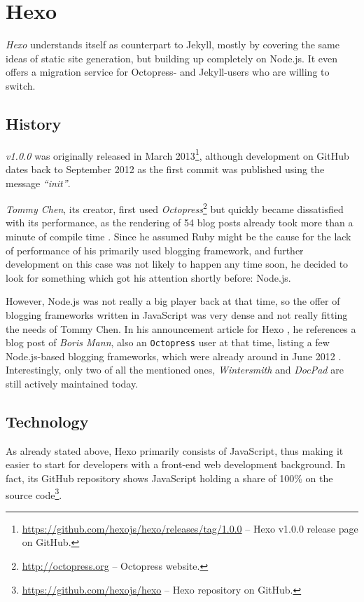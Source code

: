 \section{Hexo}
\label{sec:hexo}

\emph{Hexo} understands itself as counterpart to Jekyll, mostly by covering the same ideas of static site generation, but building up completely on Node.js. It even offers a migration service for Octopress- and Jekyll-users who are willing to switch.

\subsection{History}
\label{sec:hexo-history}
\emph{v1.0.0} was originally released in March 2013\footnote{\url{https://github.com/hexojs/hexo/releases/tag/1.0.0} -- Hexo v1.0.0 release page on GitHub.}, although development on GitHub dates back to September 2012 as the first commit was published using the message \emph{``init''}.

\emph{Tommy Chen}, its creator, first used \emph{Octopress}\footnote{\url{http://octopress.org} -- Octopress website.} but quickly became dissatisfied with its performance, as the rendering of 54 blog posts already took more than a minute of compile time \cite{Chen2012hexodebut}. Since he assumed Ruby might be the cause for the lack of performance of his primarily used blogging framework, and further development on this case was not likely to happen any time soon, he decided to look for something which got his attention shortly before: Node.js.

However, Node.js was not really a big player back at that time, so the offer of blogging frameworks written in JavaScript was very dense and not really fitting the needs of Tommy Chen. In his announcement article for Hexo \cite{Chen2012hexodebut}, he references a blog post of \emph{Boris Mann}, also an \texttt{Octopress} user at that time, listing a few Node.js-based blogging frameworks, which were already around in June 2012 \cite{Mann2012nodestaticsite}. Interestingly, only two of all the mentioned ones, \emph{Wintersmith} and \emph{DocPad} are still actively maintained today.

\subsection{Technology}
\label{sec:hexo-technology}
As already stated above, Hexo primarily consists of JavaScript, thus making it easier to start for developers with a front-end web development background. In fact, its GitHub repository shows JavaScript holding a share of 100\% on the source code\footnote{\url{https://github.com/hexojs/hexo} -- Hexo repository on GitHub.}.

